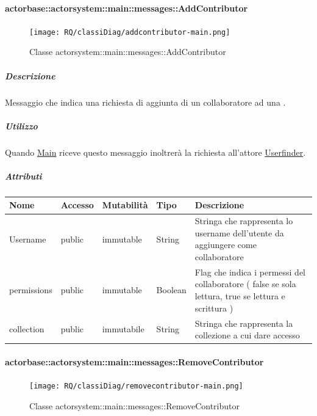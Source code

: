\documentclass{scalatekids-article}
\begin{document}
\paragraph{actorbase::actorsystem::main::messages::AddContributor}
\label{sec:actorbase::actorsystem::main::messages::AddContributor}

\begin{figure}[H]
   \begin{center}
     \texttt{[image: RQ/classiDiag/addcontributor-main.png]}
     \caption{Classe actorsystem::main::messages::AddContributor}
   \end{center}
 \end{figure}

\subparagraph{Descrizione}

Messaggio che indica una richiesta di aggiunta di un collaboratore ad una
.

\subparagraph{Utilizzo}

Quando \hyperref[sec:actorbase::actorsystem::main::Main]{Main}
riceve questo messaggio inoltrerà la richiesta all'attore
\hyperref[sec:actorbase::actorsystem::userfinder::Userfinder]{Userfinder}.

\subparagraph{Attributi}
\begin{tabular}{| p{3cm} | p{1.5cm} | p{2cm} | p{2cm} | p{8.5cm} |}
  \hline
  Nome & Accesso & Mutabilità & Tipo & Descrizione\\
  \hline
  Username & public & immutable & String & Stringa che rappresenta lo username dell'utente da aggiungere come collaboratore\\
  \hline
  permissions & public & immutable & Boolean & Flag che indica i permessi del collaboratore ( false se sola lettura, true se lettura e scrittura )\\
  \hline
  collection & public & immutabile & String & Stringa che rappresenta la collezione a cui dare accesso\\
  \hline
\end{tabular}

\paragraph{actorbase::actorsystem::main::messages::RemoveContributor}
\label{sec:actorbase::actorsystem::main::messages::RemoveContributor}

\begin{figure}[H]
   \begin{center}
     \texttt{[image: RQ/classiDiag/removecontributor-main.png]}
     \caption{Classe actorsystem::main::messages::RemoveContributor}
   \end{center}
 \end{figure}
\end{document}
